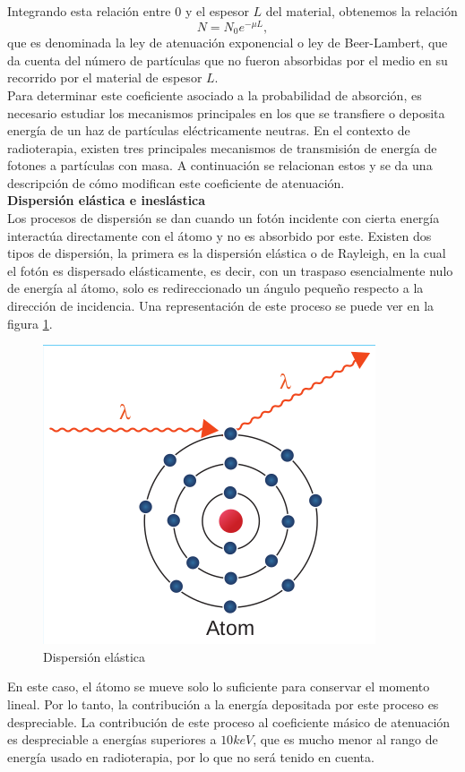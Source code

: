 Integrando esta relación entre $0$ y el espesor $L$ del material, obtenemos la relación
\begin{equation}
	N=N_0 e^{-\mu L},
\end{equation}
que es denominada la ley de atenuación exponencial o ley de Beer-Lambert\cite{Attix1986}, que da cuenta del número de partículas que no fueron absorbidas por el medio en su recorrido por el material de espesor $L$.\\

Para determinar este coeficiente asociado a la probabilidad de absorción, es necesario estudiar los mecanismos principales en los que se transfiere o deposita energía de un haz de partículas eléctricamente neutras. En el contexto de radioterapia, existen tres principales mecanismos de transmisión de energía  de fotones a partículas con masa. A continuación se relacionan estos y se da una descripción de cómo modifican este coeficiente de atenuación.\\

\noindent
\textbf{Dispersión elástica e ineslástica}\\

Los procesos de dispersión se dan cuando un fotón incidente con cierta energía interactúa directamente con el átomo y no es absorbido por este. Existen dos tipos de dispersión, la primera es la dispersión elástica o de Rayleigh, en la cual el fotón es dispersado elásticamente, es decir, con un traspaso esencialmente nulo de energía al átomo, solo es redireccionado un ángulo pequeño respecto a la dirección de incidencia. Una representación de este proceso se puede ver en la figura \ref{fig:rayleigh}.\\
\begin{figure}[H]
	\centering
	\includegraphics[width=0.7\linewidth]{images/rayleigh.png}
	\caption{Dispersión elástica\cite{khan2014the}}
	\label{fig:rayleigh}
\end{figure}
En este caso, el átomo se mueve solo lo suficiente para conservar el momento lineal. Por lo tanto, la contribución a la energía depositada por este proceso es despreciable. La contribución de este proceso al coeficiente másico de atenuación es despreciable a energías superiores a $10 keV$, que es mucho menor al rango de energía usado en radioterapia, por lo que no será tenido en cuenta.  \\

